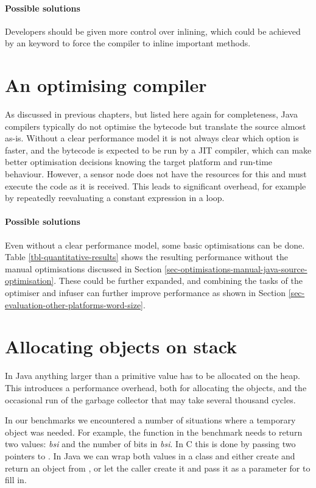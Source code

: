 \paragraph{Possible solutions}
Developers should be given more control over inlining, which could be achieved by an  keyword to force the compiler to inline important methods.



\section{An optimising compiler}
\label{sec-optimising-javac}
As discussed in previous chapters, but listed here again for completeness, Java compilers typically do not optimise the bytecode but translate the source almost as-is. Without a clear performance model it is not always clear which option is faster, and the bytecode is expected to be run by a JIT compiler, which can make better optimisation decisions knowing the target platform and run-time behaviour. However, a sensor node does not have the resources for this and must execute the code as it is received. This leads to significant overhead, for example by repeatedly reevaluating a constant expression in a loop.

\paragraph{Possible solutions}
Even without a clear performance model, some basic optimisations can be done. Table \ref{tbl-quantitative-results} shows the resulting performance without the manual optimisations discussed in Section \ref{sec-optimisations-manual-java-source-optimisation}. These could be further expanded, and combining the tasks of the optimiser and infuser can further improve performance as shown in Section \ref{sec-evaluation-other-platforms-word-size}.




\section{Allocating objects on stack}
\label{sec-no-gc}
In Java anything larger than a primitive value has to be allocated on the heap. This introduces a performance overhead, both for allocating the objects, and the occasional run of the garbage collector that may take several thousand cycles.

In our benchmarks we encountered a number of situations where a temporary object was needed. For example, the  function in the  benchmark needs to return two values: \emph{bsi} and the number of bits in \emph{bsi}. In C this is done by passing two pointers to . In Java we can wrap both values in a class and either create and return an object from , or let the caller create it and pass it as a parameter for  to fill in.

